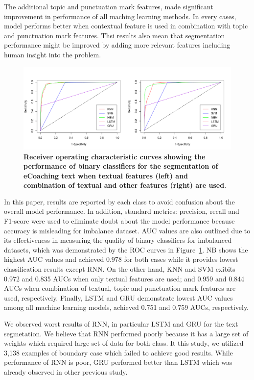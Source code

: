 \documentclass{amia}
\begin{document}
The additional topic and punctuation mark features, made significant improvement in performance of all maching learning methods. In every cases, model performs better when contextual feature is used in combination with topic and punctuation mark features. Thsi results also mean that segmentation performance might be improved by adding more relevant features including human insight into the problem.       

\begin{figure}[!htb]
    \centering
    \includegraphics[width=1.0\textwidth]{figures/roc-curves.png}
    \caption{\textbf{Receiver operating characteristic curves showing the performance of binary classifiers for the segmentation of eCoaching text when textual features (left) and combination of textual and other features (right) are used}.}
    \label{fig:roc-curves}
\end{figure}

In this paper, results are reported by each class to avoid confusion about the overall model performance. In addition, standard metrics: precision, recall and F1-score were used to eliminate doubt about the model performance because accuracy is misleading for imbalance dataset. AUC values are also outlined due to its effectiveness in measuring the quality of binary classifiers for imbalanced datasets\cite{hu2015kernelized}, which was demonstrated by the ROC curves in Figure~\ref{fig:roc-curves}. NB shows the highest AUC values and achieved 0.978 for both cases while it provides lowest classification results except RNN. On the other hand, KNN and SVM exibits 0.972 and 0.835 AUCs when only textual features are used; and 0.959 and 0.844 AUCs when combination of textual, topic and punctuation mark features are used, respectively. Finally, LSTM and GRU demonstrate lowest AUC values among all machine learning models, achieved 0.751 and 0.759 AUCs, respectively. 

We observed worst results of RNN, in particular LSTM and GRU for the text segmetation. We believe that RNN performed poorly because it has a large set of weights which required large set of data for both class. It this study, we utilized 3,138 examples of boundary case which failed to achieve good results. While performance of RNN is poor, GRU performed better than LSTM which was already observed in other previous study\cite{chung2014empirical}.
\end{document}
